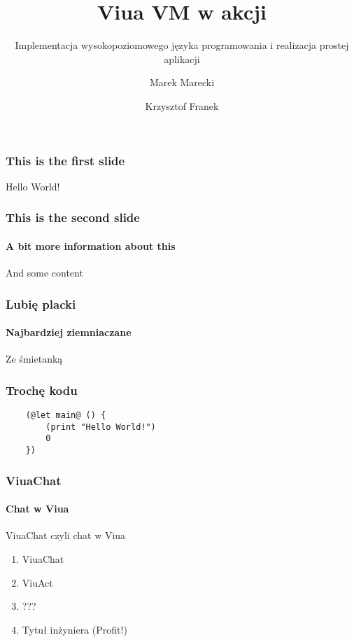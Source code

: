 \documentclass{beamer}
\title{Viua VM w akcji}
\subtitle{Implementacja wysokopoziomowego języka programowania i realizacja prostej aplikacji}
\author{Marek Marecki \and Krzysztof Franek}
\begin{document}

\frame{\titlepage}

\begin{frame}
    \frametitle{This is the first slide}

    Hello World!
\end{frame}

\begin{frame}
    \frametitle{This is the second slide}
    \framesubtitle{A bit more information about this}

    And some content
\end{frame}

\begin{frame}
    \frametitle{Lubię placki}
    \framesubtitle{Najbardziej ziemniaczane}

    Ze śmietanką
\end{frame}

\begin{frame}[fragile]
    \frametitle{Trochę kodu}

    \begin{lstlisting}
    (@let main@ () {
        (print "Hello World!")
        0
    })
    \end{lstlisting}
\end{frame}

\begin{frame}
    \frametitle{ViuaChat}
    \framesubtitle{Chat w Viua}

    ViuaChat czyli chat w Viua

    \begin{enumerate}
        \item ViuaChat
        \item ViuAct
        \item ???
        \item Tytuł inżyniera (Profit!)
    \end{enumerate}
\end{frame}
\end{document}
